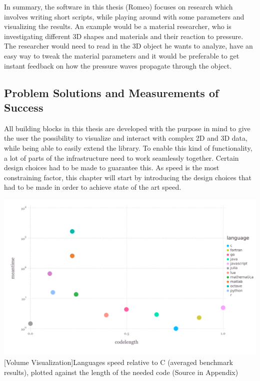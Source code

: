 In summary, the software in this thesis (Romeo) focuses on research which involves writing short scripts, while playing around with some parameters and visualizing the results. 
An example would be a material researcher, who is investigating different 3D shapes and materials and their reaction to pressure.
The researcher would need to read in the 3D object he wants to analyze, have an easy way to tweak the material parameters and it would be preferable to get instant feedback on how the pressure waves propagate through the object.


\subsection{Problem Solutions and Measurements of Success}

All building blocks in this thesis are developed with the purpose in mind to give the user the possibility to visualize and interact with complex 2D and 3D data, while being able to easily extend the library.
To enable this kind of functionality, a lot of parts of the infrastructure need to work seamlessly together.
Certain design choices had to be made to guarantee this. As speed is the most constraining factor, this chapter will start by introducing the design choices that had to be made in order to achieve state of the art speed.

\vspace{1em}
\begin{minipage}{\linewidth}
    \centering
    \includegraphics[width=0.9\linewidth]{graphics/julia_bench.pdf}
    [Volume Visualization]{Languages speed relative to C (averaged benchmark results), plotted against the length of the needed code (Source in Appendix)}
    \label{fig:juliabench}
\end{minipage}

